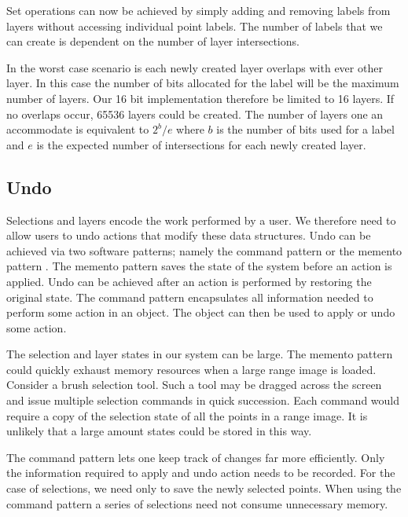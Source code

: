 Set operations can now be achieved by simply adding and removing labels from layers without accessing individual point labels. The number of labels that we can create is dependent on the number of layer intersections.

In the worst case scenario is each newly created layer overlaps with ever other layer. In this case the number of bits allocated for the label will be the maximum number of layers. Our 16 bit implementation therefore be limited to 16 layers. If no overlaps occur, 65536 layers could be created. The number of layers one an accommodate is equivalent to $2^b/e$ where $b$ is the number of bits used for a label and $e$ is the expected number of intersections for each newly created layer.


\subsection{Undo}
Selections and layers encode the work performed by a user. We therefore need to allow users to undo actions that modify these data structures. Undo can be achieved via two software patterns; namely the command pattern or the memento pattern \cite{Gamma1995}. The memento pattern saves the state of the system before an action is applied. Undo can be achieved after an action is performed by restoring the original state. The command pattern encapsulates all information needed to perform some action in an object. The object can then be used to apply or undo some action.

The selection and layer states in our system can be large. The memento pattern could quickly exhaust memory resources when a large range image is loaded. Consider a brush selection tool. Such a tool may be dragged across the screen and issue multiple selection commands in quick succession. Each command would require a copy of the selection state of all the points in a range image. It is unlikely that a large amount states could be stored in this way.

The command pattern lets one keep track of changes far more efficiently. Only the information required to apply and undo action needs to be recorded. For the case of selections, we need only to save the newly selected points. When using the command pattern a series of selections need not consume unnecessary memory. 

